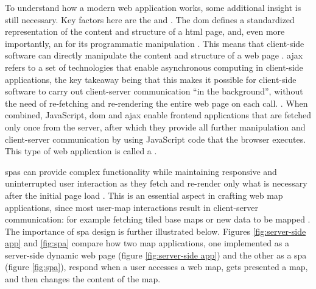 To understand how a modern web application works,
some additional insight is still necessary.
Key factors here are the  and
.
The \acrshort{dom} defines a standardized representation of
the content and structure of a \acrshort{html} page,
and, even more importantly, an  for its
programmatic manipulation \parencite{w3cdom}.
This means that client-side software can
directly manipulate the content and structure of a web page \parencite{w3cdom}.
\acrshort{ajax} refers to a set of technologies that
enable asynchronous computing in client-side applications,
the key takeaway being that this makes it possible for client-side software to
carry out client-server communication \enquote{in the background},
without the need of re-fetching and re-rendering the entire web page on each call.
\parencite{gar2005}.
When combined, JavaScript, \acrshort{dom} and \acrshort{ajax} enable
frontend applications that are fetched only once from the server,
after which they provide all further manipulation and client-server communication by using
JavaScript code that the browser executes.
This type of web application
is called a  \parencite{fin2014}.

\acrshort{spa}s can provide complex functionality while
maintaining responsive and uninterrupted user interaction
as they fetch and re-render only what is necessary
after the initial page load \parencite{fin2014}.
This is an essential aspect in crafting web map applications,
since most user-map interactions result in client-server communication:
for example fetching tiled base maps or new data to be mapped
\parencite{mai2017}.
The importance of \acrshort{spa} design is further illustrated below.
Figures \ref{fig:server-side app} and \ref{fig:spa} compare
how two map applications,
one implemented as a server-side dynamic web page (figure \ref{fig:server-side app})
and the other as a \acrshort{spa} (figure \ref{fig:spa}),
respond when a user accesses a web map,
gets presented a map, and then changes the content of the map.

